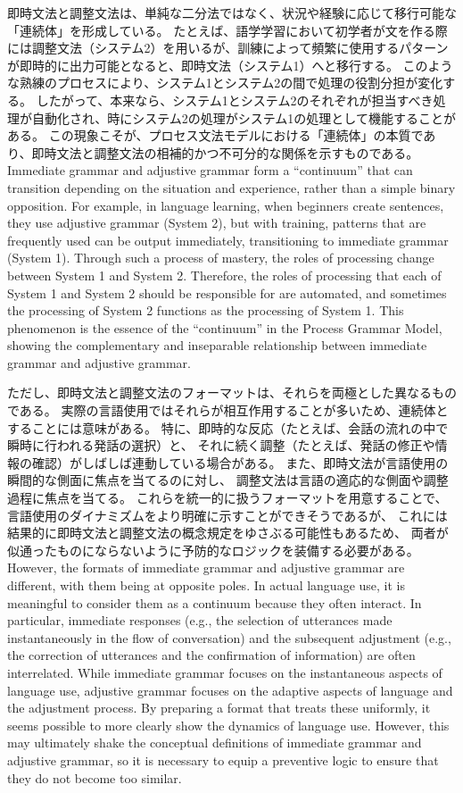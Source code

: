 \documentclass[a4paper,xelatex,ja=standard]{bxjsarticle}
\begin{document}
\ifJPN
即時文法と調整文法は、単純な二分法ではなく、状況や経験に応じて移行可能な「連続体」を形成している。
たとえば、語学学習において初学者が文を作る際には調整文法（システム2）を用いるが、訓練によって頻繁に使用するパターンが即時的に出力可能となると、即時文法（システム1）へと移行する。
このような熟練のプロセスにより、システム1とシステム2の間で処理の役割分担が変化する。
したがって、本来なら、システム1とシステム2のそれぞれが担当すべき処理が自動化され、時にシステム2の処理がシステム1の処理として機能することがある。
この現象こそが、プロセス文法モデルにおける「連続体」の本質であり、即時文法と調整文法の相補的かつ不可分的な関係を示すものである。
\else
Immediate grammar and adjustive grammar form a ``continuum'' that can transition depending on the situation and experience, rather than a simple binary opposition.
For example, in language learning, when beginners create sentences, they use adjustive grammar (System 2), but with training, patterns that are frequently used can be output immediately, transitioning to immediate grammar (System 1).
Through such a process of mastery, the roles of processing change between System 1 and System 2.
Therefore, the roles of processing that each of System 1 and System 2 should be responsible for are automated, and sometimes the processing of System 2 functions as the processing of System 1.
This phenomenon is the essence of the ``continuum'' in the Process Grammar Model, showing the complementary and inseparable relationship between immediate grammar and adjustive grammar.
\fi

\ifJPN
ただし、即時文法と調整文法のフォーマットは、それらを両極とした異なるものである。
実際の言語使用ではそれらが相互作用することが多いため、連続体とすることには意味がある。
特に、即時的な反応（たとえば、会話の流れの中で瞬時に行われる発話の選択）と、
それに続く調整（たとえば、発話の修正や情報の確認）がしばしば連動している場合がある。
また、即時文法が言語使用の瞬間的な側面に焦点を当てるのに対し、
調整文法は言語の適応的な側面や調整過程に焦点を当てる。
これらを統一的に扱うフォーマットを用意することで、
言語使用のダイナミズムをより明確に示すことができそうであるが、
これには結果的に即時文法と調整文法の概念規定をゆさぶる可能性もあるため、
両者が似通ったものにならないように予防的なロジックを装備する必要がある。
\else
However, the formats of immediate grammar and adjustive grammar are different, with them being at opposite poles.
In actual language use, it is meaningful to consider them as a continuum because they often interact.
In particular, immediate responses (e.g., the selection of utterances made instantaneously in the flow of conversation) and the subsequent adjustment (e.g., the correction of utterances and the confirmation of information) are often interrelated.
While immediate grammar focuses on the instantaneous aspects of language use, adjustive grammar focuses on the adaptive aspects of language and the adjustment process.
By preparing a format that treats these uniformly, it seems possible to more clearly show the dynamics of language use.
However, this may ultimately shake the conceptual definitions of immediate grammar and adjustive grammar, so it is necessary to equip a preventive logic to ensure that they do not become too similar.
\fi
\end{document}
